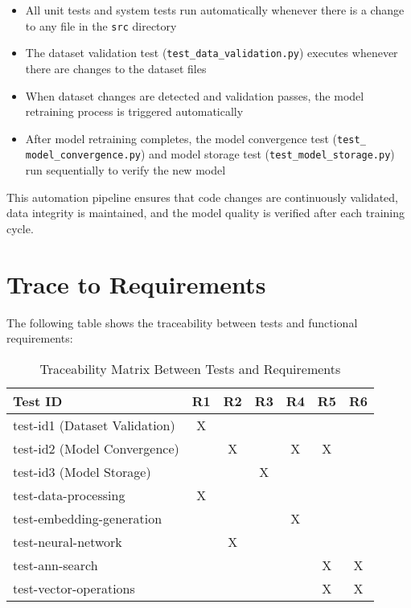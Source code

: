 \documentclass[12pt, titlepage]{article}
\begin{document}
\begin{itemize}
    \item All unit tests and system tests run automatically whenever there is a change to any file in the \texttt{src} directory
    \item The dataset validation test (\texttt{test\_data\_validation.py}) executes whenever there are changes to the dataset files
    \item When dataset changes are detected and validation passes, the model retraining process is triggered automatically
    \item After model retraining completes, the model convergence test (\texttt{test\_} \texttt{model\_convergence.py}) and model storage test (\texttt{test\_model\_storage.py}) run sequentially to verify the new model
\end{itemize}

This automation pipeline ensures that code changes are continuously validated, data integrity is maintained, and the model quality is verified after each training cycle.

\section{Trace to Requirements}
The following table shows the traceability between tests and functional requirements:

\begin{table}[h!]
\centering
\begin{tabular}{|l|c|c|c|c|c|c|}
\hline
\textbf{Test ID} & \textbf{R1} & \textbf{R2} & \textbf{R3} & \textbf{R4} & \textbf{R5} & \textbf{R6} \\
\hline
test-id1 (Dataset Validation) & X &  &  &  &  &  \\
\hline
test-id2 (Model Convergence) &  & X &  & X & X &  \\
\hline
test-id3 (Model Storage) &  &  & X &  &  &  \\
\hline
test-data-processing &  X &  &  &  &  &  \\
\hline
test-embedding-generation &  &  &  & X &  &  \\
\hline
test-neural-network &  & X &  &  &  &  \\
\hline
test-ann-search &  &  &  &  & X & X \\
\hline
test-vector-operations &  &  &  &  & X & X \\
\hline
\end{tabular}
\caption{Traceability Matrix Between Tests and Requirements}
\label{Table:req_trace}
\end{table}
\end{document}
